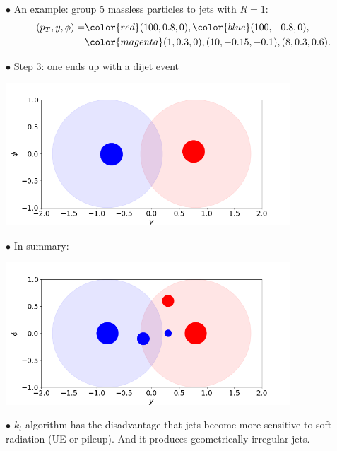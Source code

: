 \documentclass[9pt,a4paper,unknownkeysallowed,xcolor=dvipsnames,aspectratio=43]{beamer}
\begin{document}
%
%
\begin{frame}\vspace{2mm}

{\color{darkred}\Large$\bullet$} An example: group 5 massless particles to jets with $R=1$:
\begin{align}
(p_T, y, \phi) = &{\color{red}(100, 0.8, 0)}, {\color{blue}(100, -0.8, 0)},\notag\\
&{\color{magenta}(1, 0.3, 0), (10, -0.15, -0.1), (8, 0.3, 0.6)}.\notag
\end{align}

{\color{darkred}\Large$\bullet$} Step 3: one ends up with a dijet event
\vspace{2mm}
\begin{center}
\includegraphics[width=0.8\textwidth]{kt3.png}
\end{center}
\end{frame}
%
%
\begin{frame}\vspace{2mm}

{\color{darkred}\Large$\bullet$} In summary:
\vspace{2mm}

\begin{center}
\includegraphics[width=0.8\textwidth]{03/ktcls.png}
\end{center}
\vspace{2mm}

{\color{darkred}\Large$\bullet$} $k_t$ algorithm has the {\color{darkred}disadvantage} that jets become more sensitive to soft radiation (UE or pileup). And it produces geometrically irregular jets.
\end{frame}
\end{document}
